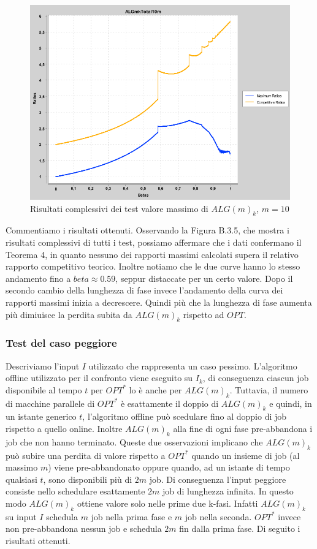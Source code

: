 \documentclass[12pt]{article}
\begin{document}
\begin{figure}[H]
\caption{Risultati complessivi dei test valore massimo di $ALG(m)_{k}$, $m = 10$}
\centering
\includegraphics[scale=0.4]{max/ALGmkTotalm10.png}
\end{figure}
Commentiamo i risultati ottenuti. Osservando la Figura B.3.5, che mostra i risultati complessivi di tutti i test, possiamo affermare che i dati confermano il Teorema 4, in quanto nessuno dei rapporti massimi calcolati supera il relativo rapporto competitivo teorico. Inoltre notiamo che le due curve hanno lo stesso andamento fino a $beta \approx 0.59$, seppur distaccate per un certo valore. Dopo il secondo cambio della lunghezza di fase invece l'andamento della curva dei rapporti massimi inizia a decrescere. Quindi più che la lunghezza di fase aumenta più dimiuisce la perdita subita da $ALG(m)_{k}$ rispetto ad $OPT$.
 
\subsubsection{Test del caso peggiore}
Descriviamo l'input $I$ utilizzato che rappresenta un caso pessimo. L'algoritmo offline utilizzato per il confronto viene eseguito su $I_{k}$, di conseguenza ciascun job disponibile al tempo $t$ per $OPT^{*}$ lo è anche per $ALG(m)_{k}$. Tuttavia, il numero di macchine parallele di $OPT^{*}$ è esattamente il doppio di $ALG(m)_{k}$ e quindi, in un istante generico $t$, l'algoritmo offline può scedulare fino al doppio di job rispetto a quello online. Inoltre $ALG(m)_{k}$ alla fine di ogni fase pre-abbandona i job che non hanno terminato. Queste due osservazioni implicano che $ALG(m)_{k}$ può subire una perdita di valore rispetto a $OPT^{*}$ quando un insieme di job (al massimo $m$) viene pre-abbandonato oppure quando, ad un istante di tempo qualsiasi $t$, sono disponibili più di $2m$ job. Di conseguenza l'input peggiore consiste nello schedulare esattamente $2m$ job di lunghezza infinita. In questo modo $ALG(m)_{k}$ ottiene valore solo nelle prime due k-fasi. Infatti $ALG(m)_{k}$ su input $I$ schedula $m$ job nella prima fase e $m$ job nella seconda. $OPT^{*}$ invece non pre-abbandona nessun job e schedula $2m$ fin dalla prima fase. Di seguito i risultati ottenuti.
\end{document}

